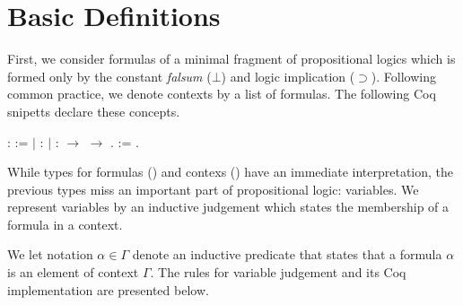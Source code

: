 \section{Basic Definitions}\label{sec:definitions}


First, we consider formulas of a minimal fragment of propositional logics which is formed only by the constant
\emph{falsum} ($\bot$) and logic implication ($\supset$). Following common
practice, we denote contexts by a list of formulas. The following Coq snipetts
declare these concepts.


\begin{minipage}[c]{0.3\textwidth}
\begin{coqdoccode}
\coqdocemptyline
\coqdocnoindent
{} \coqdocvar{$\alpha$} :  :=\coqdoceol
\coqdocnoindent
\ensuremath{|}  : \coqdocvar{$\alpha$}\coqdoceol
\coqdocnoindent
\ensuremath{|}  : \coqdocvar{$\alpha$} \ensuremath{\rightarrow} \coqdocvar{$\alpha$} \ensuremath{\rightarrow} \coqdocvar{$\alpha$}.\coqdoceol
\coqdocemptyline
\coqdocnoindent
{} \coqdocvar{$\Gamma$} :=  \coqdocvar{$\alpha$}.\coqdoceol
\coqdocemptyline
\end{coqdoccode}
\end{minipage}
\begin{minipage}[c]{0.6\textwidth}
While types for formulas (\coqdocvar{$\alpha$}) and contexs (\coqdocvar{$\Gamma$}) have an immediate interpretation, the previous types
miss an important part of propositional logic: variables. We represent variables by an inductive judgement
which states the membership of a formula in a context.
\end{minipage}


We let notation $\alpha \in \Gamma$ denote an inductive predicate that states that a formula $\alpha$
is an element of context $\Gamma$. The rules for variable judgement and its Coq implementation are presented below.



